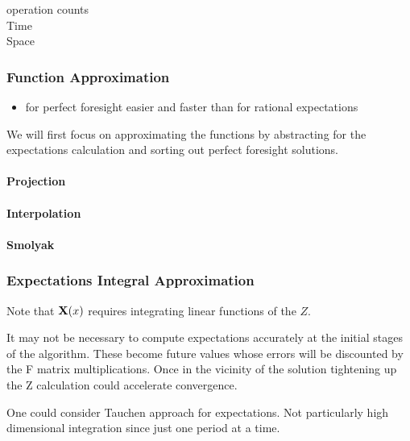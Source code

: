 \documentclass[12pt]{article}
\begin{document}
\begin{description}
\item[operation counts] 
\item[Time] 
\item[Space] 
\end{description}

\subsubsection{Function Approximation}
\label{sec:funct-appr}

\begin{itemize}
\item for perfect foresight easier and faster than for rational expectations 
\end{itemize}

We will first focus on approximating the functions by abstracting for the expectations calculation and sorting out perfect foresight solutions.
\paragraph{Projection}



\paragraph{Interpolation}

\paragraph{Smolyak}

\subsubsection{Expectations Integral Approximation}
\label{sec:funct-appr}

Note that $\mathbf{X}(x)$  requires integrating linear functions of the $Z$.


It may not be necessary to compute expectations accurately at the initial stages of the algorithm.  These become future values whose errors will be discounted by the F matrix multiplications.  Once in the vicinity of the solution
tightening up the Z calculation could accelerate convergence.


One could consider Tauchen approach for expectations.  Not particularly high
dimensional integration since just one period at a time.
\end{document}
